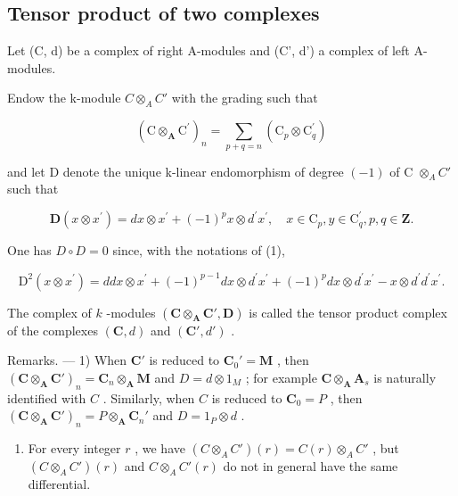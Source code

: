 \subsection{Tensor product of two complexes}

Let (C, d) be a complex of right A-modules and (C', d') a complex of left A-modules.

Endow the k-module \(C \otimes_{A} C'\) with the grading such that

\[
(\mathrm{C} \otimes_ {\mathbf {A}} \mathrm{C} ^ {\prime}) _ {n} = \sum_ {p + q = n} (\mathrm{C} _ {p} \otimes \mathrm{C} _ {q} ^ {\prime})
\]

and let D denote the unique k-linear endomorphism of degree \((-1)\) of C \(\otimes_{A} C'\) such that

\[
\mathbf {D} (x \otimes x ^ {\prime}) = d x \otimes x ^ {\prime} + (- 1) ^ {p} x \otimes d ^ {\prime} x ^ {\prime}, \quad x \in \mathrm{C} _ {p}, y \in \mathrm{C} _ {q} ^ {\prime}, p, q \in \mathbf {Z}. \tag {1}
\]

One has \(D \circ D = 0\) since, with the notations of (1),

\[
\mathrm{D} ^ {2} (x \otimes x ^ {\prime}) = d d x \otimes x ^ {\prime} + (- 1) ^ {p - 1} d x \otimes d ^ {\prime} x ^ {\prime} + (- 1) ^ {p} d x \otimes d ^ {\prime} x ^ {\prime} - x \otimes d ^ {\prime} d ^ {\prime} x ^ {\prime}.
\]

The complex of \(k\) -modules \((\mathbf{C} \otimes_{\mathbf{A}} \mathbf{C}', \mathbf{D})\) is called the tensor product complex of the complexes \((\mathbf{C}, d)\) and \((\mathbf{C}', d')\) .

Remarks. --- 1) When \(\mathbf{C}'\) is reduced to \(\mathbf{C}_0' = \mathbf{M}\) , then \((\mathbf{C} \otimes_{\mathbf{A}} \mathbf{C}')_n = \mathbf{C}_n \otimes_{\mathbf{A}} \mathbf{M}\) and \(D = d \otimes 1_M\) ; for example \(\mathbf{C} \otimes_{\mathbf{A}} \mathbf{A}_s\) is naturally identified with \(C\) . Similarly, when \(C\) is reduced to \(\mathbf{C}_0 = P\) , then \((\mathbf{C} \otimes_{\mathbf{A}} \mathbf{C}')_n = P \otimes_{\mathbf{A}} \mathbf{C}_n'\) and \(D = 1_P \otimes d\) .

\begin{enumerate}
\def\labelenumi{\arabic{enumi})}
\setcounter{enumi}{1}
\tightlist
\item
  For every integer \(r\) , we have \((C \otimes_{A} C')(r) = C(r) \otimes_{A} C'\) , but \((C \otimes_{A} C')(r)\) and \(C \otimes_{A} C'(r)\) do not in general have the same differential.
\end{enumerate}

